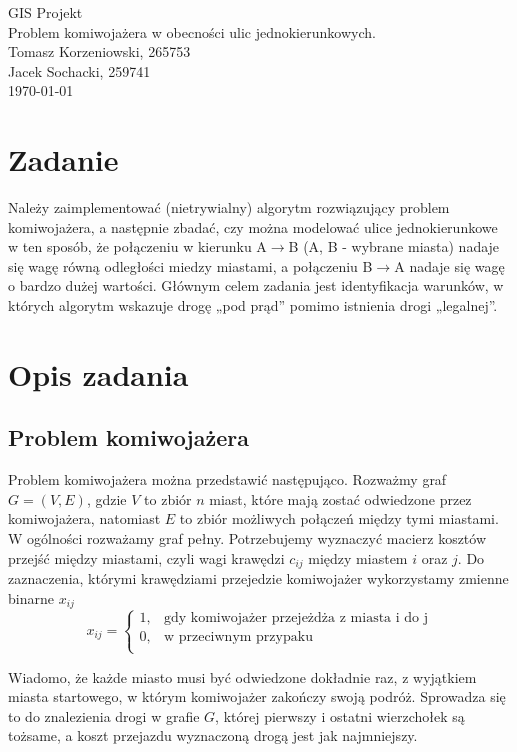 \documentclass[11pt,a4paper,twoside]{article}
\begin{document}
\begin{center}
\vspace*{3\baselineskip}
{\LARGE{GIS Projekt}}
\\
\vspace*{1\baselineskip}
{\large{Problem komiwojażera w obecności ulic jednokierunkowych.}}
\\
\vspace*{1\baselineskip}
Tomasz Korzeniowski, 265753\\
Jacek Sochacki, 259741
\\
\vspace*{1\baselineskip}
\today
\end{center}
\section{Zadanie}
Należy zaimplementować (nietrywialny) algorytm rozwiązujący problem komiwojażera, a następnie zbadać, czy można modelować ulice jednokierunkowe w ten sposób, że połączeniu w kierunku A$\rightarrow$B (A, B - wybrane miasta) nadaje się wagę równą odległości miedzy miastami, a połączeniu B$\rightarrow$A nadaje się wagę o bardzo dużej wartości. Głównym celem zadania jest identyfikacja warunków, w których algorytm wskazuje drogę „pod prąd” pomimo istnienia drogi „legalnej”.
\section{Opis zadania}
\subsection{Problem komiwojażera}
Problem komiwojażera można przedstawić następująco. Rozważmy graf $G=(V, E)$, gdzie $V$ to zbiór $n$ miast, które mają zostać odwiedzone przez komiwojażera, natomiast $E$ to zbiór możliwych połączeń między tymi miastami. W ogólności rozważamy graf pełny. Potrzebujemy wyznaczyć macierz kosztów przejść między miastami, czyli wagi krawędzi $c_{ij}$ między miastem $i$ oraz $j$. Do zaznaczenia, którymi krawędziami przejedzie komiwojażer wykorzystamy zmienne binarne $x_{ij}$
$$x_{ij} = 
	\begin{cases} 
      1, & \text{gdy komiwojażer przejeżdża z miasta i do j} \\
      0, & \text{w przeciwnym przypaku}\\
   \end{cases}
$$

Wiadomo, że każde miasto musi być odwiedzone dokładnie raz, z wyjątkiem miasta startowego, w którym komiwojażer zakończy swoją podróż. Sprowadza się to do znalezienia drogi w grafie $G$, której pierwszy i ostatni wierzchołek są tożsame, a koszt przejazdu wyznaczoną drogą jest jak najmniejszy. 
\end{document}
